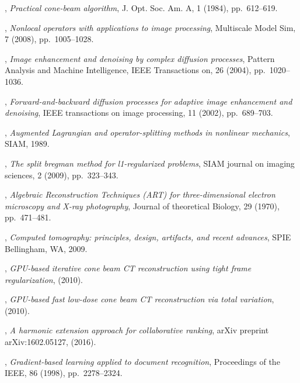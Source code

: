 \documentclass[letterpaper,10pt]{article}
\begin{document}
\begin{thebibliography}{10}
, {\em Practical cone-beam
  algorithm}, J. Opt. Soc. Am. A, 1 (1984), pp.~612--619.

, {\em Nonlocal operators with applications to
  image processing}, Multiscale Model Sim, 7 (2008), pp.~1005--1028.

, {\em Image enhancement and
  denoising by complex diffusion processes}, Pattern Analysis and Machine
  Intelligence, IEEE Transactions on, 26 (2004), pp.~1020--1036.

, {\em Forward-and-backward
  diffusion processes for adaptive image enhancement and denoising}, IEEE
  transactions on image processing, 11 (2002), pp.~689--703.

, {\em Augmented Lagrangian and
  operator-splitting methods in nonlinear mechanics}, SIAM, 1989.

, {\em The split bregman method for
  l1-regularized problems}, SIAM journal on imaging sciences, 2 (2009),
  pp.~323--343.

, {\em {Algebraic Reconstruction
  Techniques (ART) for three-dimensional electron microscopy and X-ray
  photography}}, Journal of theoretical Biology, 29 (1970), pp.~471--481.

, {\em Computed tomography: principles, design, artifacts, and
  recent advances}, SPIE Bellingham, WA, 2009.

, {\em {GPU}-based iterative cone
  beam {CT} reconstruction using tight frame regularization},  (2010).

, {\em
  {GPU}-based fast low-dose cone beam {CT} reconstruction via total variation},
   (2010).

, {\em A harmonic extension
  approach for collaborative ranking}, arXiv preprint arXiv:1602.05127,
  (2016).

, {\em Gradient-based
  learning applied to document recognition}, Proceedings of the IEEE, 86
  (1998), pp.~2278--2324.


\end{thebibliography}
\end{document}
